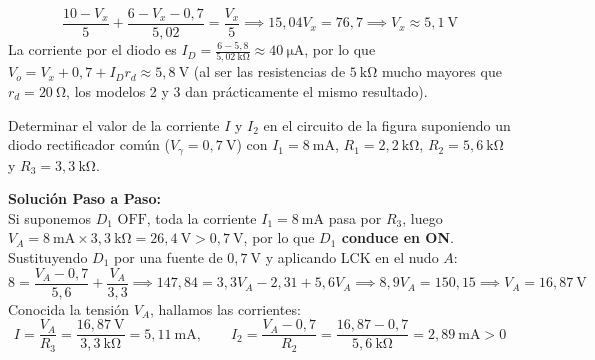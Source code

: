 \begin{ejercicio}
\begin{enumerate}[label=\alph*)]
    \begin{equation}
        \frac{10 - V_x}{5} + \frac{6 - V_x - 0{,}7}{5{,}02} = \frac{V_x}{5} \implies 15{,}04 V_x = 76{,}7 \implies V_x \approx 5{,}1\ \si{\volt}
    \end{equation}
    La corriente por el diodo es $I_D = \frac{6 - 5{,}8}{5{,}02\ \si{\kilo\ohm}} \approx 40\ \si{\micro\ampere}$, por lo que $V_o = V_x + 0{,}7 + I_D r_d \approx 5{,}8\ \si{\volt}$ (al ser las resistencias de $5\ \si{\kilo\ohm}$ mucho mayores que $r_d = 20\ \si{\ohm}$, los modelos 2 y 3 dan prácticamente el mismo resultado).
\end{enumerate}
\end{ejercicio}

\begin{ejercicio}
Determinar el valor de la corriente $I$ y $I_2$ en el circuito de la figura suponiendo un diodo rectificador común ($V_\gamma = 0{,}7\ \si{\volt}$) con $I_1 = 8\ \si{\milli\ampere}$, $R_1 = 2{,}2\ \si{\kilo\ohm}$, $R_2 = 5{,}6\ \si{\kilo\ohm}$ y $R_3 = 3{,}3\ \si{\kilo\ohm}$.
\tcbline
\begin{center}
\end{center}
\textbf{Solución Paso a Paso:}\\[4pt]
Si suponemos $D_1\text{ OFF}$, toda la corriente $I_1 = 8\ \si{\milli\ampere}$ pasa por $R_3$, luego $V_A = 8\ \si{\milli\ampere} \times 3{,}3\ \si{\kilo\ohm} = 26{,}4\ \si{\volt} > 0{,}7\ \si{\volt}$, por lo que \textbf{$D_1$ conduce en ON}.
Sustituyendo $D_1$ por una fuente de $0{,}7\ \si{\volt}$ y aplicando LCK en el nudo $A$:
\begin{equation}
    8 = \frac{V_A - 0{,}7}{5{,}6} + \frac{V_A}{3{,}3} \implies 147{,}84 = 3{,}3 V_A - 2{,}31 + 5{,}6 V_A \implies 8{,}9 V_A = 150{,}15 \implies V_A = 16{,}87\ \si{\volt}
\end{equation}
Conocida la tensión $V_A$, hallamos las corrientes:
\begin{equation}
    I = \frac{V_A}{R_3} = \frac{16{,}87\ \si{\volt}}{3{,}3\ \si{\kilo\ohm}} = 5{,}11\ \si{\milli\ampere}, \qquad I_2 = \frac{V_A - 0{,}7}{R_2} = \frac{16{,}87 - 0{,}7}{5{,}6\ \si{\kilo\ohm}} = 2{,}89\ \si{\milli\ampere} > 0
\end{equation}
\end{ejercicio}

